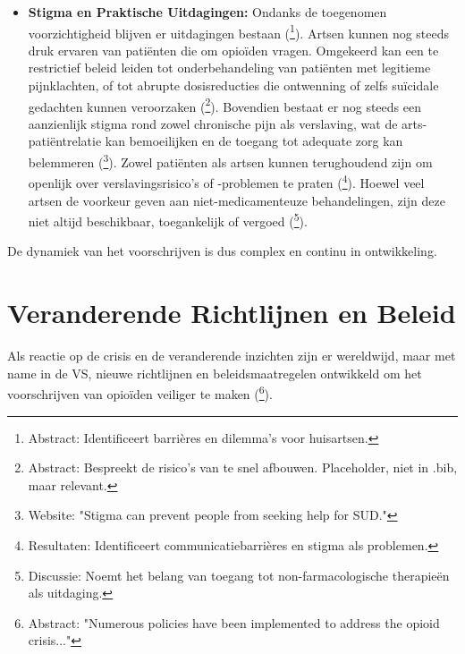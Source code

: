 \documentclass[11pt, a4paper]{report} %
\begin{document}
\begin{itemize}
    \item \textbf{Stigma en Praktische Uitdagingen:} Ondanks de toegenomen voorzichtigheid blijven er uitdagingen bestaan (\cite{Norman2022GPAttitudes}\footnote{Abstract: Identificeert barrières en dilemma's voor huisartsen.}). Artsen kunnen nog steeds druk ervaren van patiënten die om opioïden vragen. Omgekeerd kan een te restrictief beleid leiden tot onderbehandeling van patiënten met legitieme pijnklachten, of tot abrupte dosisreducties die ontwenning of zelfs suïcidale gedachten kunnen veroorzaken (\cite{Kroenke2019OpioidTapering}\footnote{Abstract: Bespreekt de risico's van te snel afbouwen. Placeholder, niet in .bib, maar relevant.}). Bovendien bestaat er nog steeds een aanzienlijk stigma rond zowel chronische pijn als verslaving, wat de arts-patiëntrelatie kan bemoeilijken en de toegang tot adequate zorg kan belemmeren (\cite{CDCStigmaReduction}\footnote{Website: "Stigma can prevent people from seeking help for SUD."}). Zowel patiënten als artsen kunnen terughoudend zijn om openlijk over verslavingsrisico's of -problemen te praten (\cite{BMJOpen2022GPAttitudes}\footnote{Resultaten: Identificeert communicatiebarrières en stigma als problemen.}). Hoewel veel artsen de voorkeur geven aan niet-medicamenteuze behandelingen, zijn deze niet altijd beschikbaar, toegankelijk of vergoed (\cite{Dowell2016CDCGuideline}\footnote{Discussie: Noemt het belang van toegang tot non-farmacologische therapieën als uitdaging.}).
\end{itemize}
De dynamiek van het voorschrijven is dus complex en continu in ontwikkeling.

\section{Veranderende Richtlijnen en Beleid}
Als reactie op de crisis en de veranderende inzichten zijn er wereldwijd, maar met name in de VS, nieuwe richtlijnen en beleidsmaatregelen ontwikkeld om het voorschrijven van opioïden veiliger te maken (\cite{Schuler2020StateScienceOpioidPolicy}\footnote{Abstract: "Numerous policies have been implemented to address the opioid crisis..."}).
\end{document}
